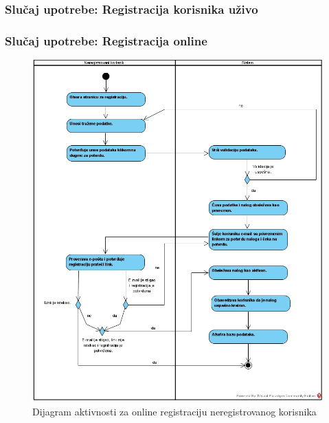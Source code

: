 \documentclass[a4paper]{article}
\begin{document}
\subsubsection{Slučaj upotrebe: Registracija korisnika uživo}


\subsubsection{Slučaj upotrebe: Registracija online}

\begin{figure}[!ht]
\begin{center}
\includegraphics[scale=0.55]{sections/images/dijagram_aktivnosti_registracija_neregistrovanog_korisnika_online.jpg}
\end{center}
\caption{Dijagram aktivnosti za online registraciju neregistrovanog korisnika}
\label{fig:kontekst}
\end{figure}


\end{document}
